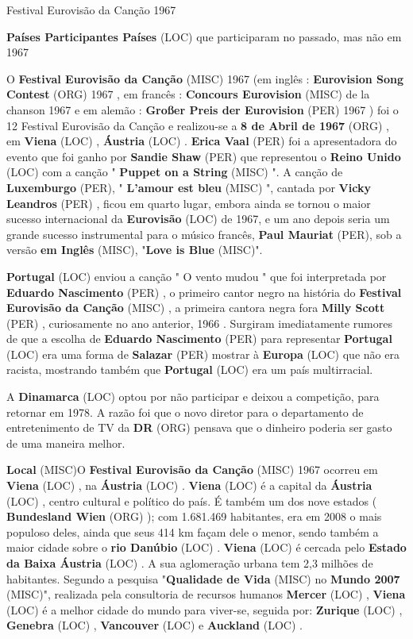 \documentclass[12pt,a4paper]{article}
\begin{document}
Festival Eurovisão da Canção 1967



\textbf{Países Participantes Países} (LOC) que participaram no passado, mas não em 1967

O \textbf{Festival Eurovisão da Canção} (MISC) 1967 (em inglês : \textbf{Eurovision Song Contest} (ORG) 1967 , em francês : \textbf{Concours Eurovision} (MISC) de la chanson 1967 e em alemão : \textbf{Großer Preis der Eurovision} (PER) 1967 ) foi o 12 Festival Eurovisão da Canção e realizou-se a \textbf{8 de Abril de 1967} (ORG) , em \textbf{Viena} (LOC) , \textbf{Áustria} (LOC) . \textbf{Erica Vaal} (PER) foi a apresentadora do evento que foi ganho por \textbf{Sandie Shaw} (PER) que representou o \textbf{Reino Unido} (LOC) com a canção " \textbf{Puppet on a String} (MISC) ". A canção de \textbf{Luxemburgo} (PER), " \textbf{L'amour est bleu} (MISC) ", cantada por \textbf{Vicky Leandros} (PER) , ficou em quarto lugar, embora ainda se tornou o maior sucesso internacional da \textbf{Eurovisão} (LOC) de 1967, e um ano depois seria um grande sucesso instrumental para o músico francês, \textbf{Paul Mauriat} (PER), sob a versão \textbf{em Inglês} (MISC), "\textbf{Love is Blue} (MISC)".

\textbf{Portugal} (LOC) enviou a canção " O vento mudou " que foi interpretada por \textbf{Eduardo Nascimento} (PER) , o primeiro cantor negro na história do \textbf{Festival Eurovisão da Canção} (MISC) , a primeira cantora negra fora \textbf{Milly Scott} (PER) , curiosamente no ano anterior, 1966 . Surgiram imediatamente rumores de que a escolha de \textbf{Eduardo Nascimento} (PER) para representar \textbf{Portugal} (LOC) era uma forma de \textbf{Salazar} (PER) mostrar à \textbf{Europa} (LOC) que não era racista, mostrando também que \textbf{Portugal} (LOC) era um país multirracial.

A \textbf{Dinamarca} (LOC) optou por não participar e deixou a competição, para retornar em 1978. A razão foi que o novo diretor para o departamento de entretenimento de TV da \textbf{DR} (ORG) pensava que o dinheiro poderia ser gasto de uma maneira melhor.



\textbf{Local} (MISC)O \textbf{Festival Eurovisão da Canção} (MISC) 1967 ocorreu em \textbf{Viena} (LOC) , na \textbf{Áustria} (LOC) . \textbf{Viena} (LOC) é a capital da \textbf{Áustria} (LOC) , centro cultural e político do país. É também um dos nove estados ( \textbf{Bundesland Wien} (ORG) ); com 1.681.469 habitantes, era em 2008 o mais populoso deles, ainda que seus 414 km façam dele o menor, sendo também a maior cidade sobre o \textbf{rio Danúbio} (LOC) . \textbf{Viena} (LOC) é cercada pelo \textbf{Estado da Baixa Áustria} (LOC) . A sua aglomeração urbana tem 2,3 milhões de habitantes. Segundo a pesquisa "\textbf{Qualidade de Vida} (MISC) no \textbf{Mundo 2007} (MISC)", realizada pela consultoria de recursos humanos \textbf{Mercer} (LOC) , \textbf{Viena} (LOC) é a melhor cidade do mundo para viver-se, seguida por: \textbf{Zurique} (LOC) , \textbf{Genebra} (LOC) , \textbf{Vancouver} (LOC) e \textbf{Auckland} (LOC) .
\end{document}
